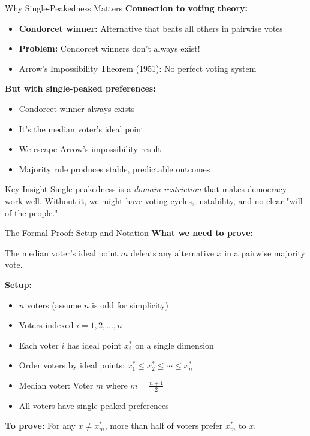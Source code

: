 \documentclass[10pt]{beamer}
\begin{document}
\begin{frame}{Why Single-Peakedness Matters}
\textbf{Connection to voting theory:}


\begin{itemize}
\item \textbf{Condorcet winner:} Alternative that beats all others in pairwise votes
\item \textbf{Problem:} Condorcet winners don't always exist!
\item \alert{Arrow's Impossibility Theorem} (1951): No perfect voting system
\end{itemize}



\textbf{But with single-peaked preferences:}
\begin{itemize}
\item Condorcet winner \alert{always exists}
\item It's the median voter's ideal point
\item We escape Arrow's impossibility result
\item Majority rule produces stable, predictable outcomes
\end{itemize}



\begin{block}{Key Insight}
Single-peakedness is a \textit{domain restriction} that makes democracy work well. Without it, we might have voting cycles, instability, and no clear "will of the people."
\end{block}
\end{frame}

\begin{frame}{The Formal Proof: Setup and Notation}
\textbf{What we need to prove:}


The median voter's ideal point $m$ defeats any alternative $x$ in a pairwise majority vote.



\textbf{Setup:}
\begin{itemize}
\item $n$ voters (assume $n$ is odd for simplicity)
\item Voters indexed $i = 1, 2, \ldots, n$
\item Each voter $i$ has ideal point $x_i^*$ on a single dimension
\item Order voters by ideal points: $x_1^* \leq x_2^* \leq \cdots \leq x_n^*$
\item \alert{Median voter:} Voter $m$ where $m = \frac{n+1}{2}$
\item All voters have single-peaked preferences
\end{itemize}



\textbf{To prove:} For any $x \neq x_m^*$, more than half of voters prefer $x_m^*$ to $x$.
\end{frame}
\end{document}
